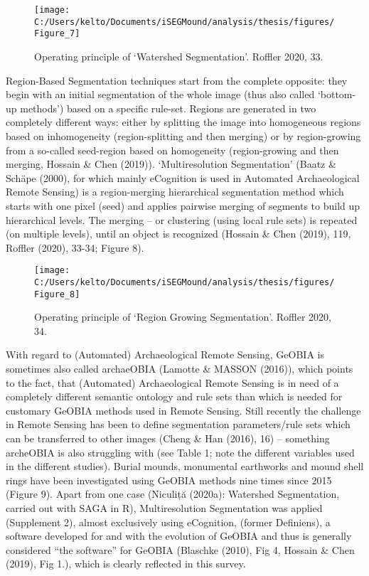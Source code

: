 \documentclass[
  12pt,
]{article}
\begin{document}
\begin{figure}

{\centering \texttt{[image: C:/Users/kelto/Documents/iSEGMound/analysis/thesis/figures/Figure\_7]} 

}

\caption{Operating principle of ‘Watershed Segmentation’. Roffler 2020, 33.}\label{fig:Figure7}
\end{figure}

Region-Based Segmentation techniques start from the complete opposite: they begin with an initial segmentation of the whole image (thus also called `bottom-up methods') based on a specific rule-set. Regions are generated in two completely different ways: either by splitting the image into homogeneous regions based on inhomogeneity (region-splitting and then merging) or by region-growing from a so-called seed-region based on homogeneity (region-growing and then merging, Hossain \& Chen (2019)). `Multiresolution Segmentation' (Baatz \& Schäpe (2000), for which mainly eCognition is used in Automated Archaeological Remote Sensing) is a region-merging hierarchical segmentation method which starts with one pixel (seed) and applies pairwise merging of segments to build up hierarchical levels. The merging -- or clustering (using local rule sets) is repeated (on multiple levels), until an object is recognized (Hossain \& Chen (2019), 119, Roffler (2020), 33-34; Figure 8).

\begin{figure}

{\centering \texttt{[image: C:/Users/kelto/Documents/iSEGMound/analysis/thesis/figures/Figure\_8]} 

}

\caption{Operating principle of ‘Region Growing Segmentation’. Roffler 2020, 34.}\label{fig:Figure8}
\end{figure}

With regard to (Automated) Archaeological Remote Sensing, GeOBIA is sometimes also called archaeOBIA (Lamotte \& MASSON (2016)), which points to the fact, that (Automated) Archaeological Remote Sensing is in need of a completely different semantic ontology and rule sets than which is needed for customary GeOBIA methods used in Remote Sensing. Still recently the challenge in Remote Sensing has been to define segmentation parameters/rule sets which can be transferred to other images (Cheng \& Han (2016), 16) -- something archeOBIA is also struggling with (see Table 1; note the different variables used in the different studies).
Burial mounds, monumental earthworks and mound shell rings have been investigated using GeOBIA methods nine times since 2015 (Figure 9). Apart from one case (Niculiță (2020a): Watershed Segmentation, carried out with SAGA in R), Multiresolution Segmentation was applied (Supplement 2), almost exclusively using eCognition, (former Definiens), a software developed for and with the evolution of GeOBIA and thus is generally considered ``the software'' for GeOBIA (Blaschke (2010), Fig 4, Hossain \& Chen (2019), Fig 1.), which is clearly reflected in this survey.
\end{document}
